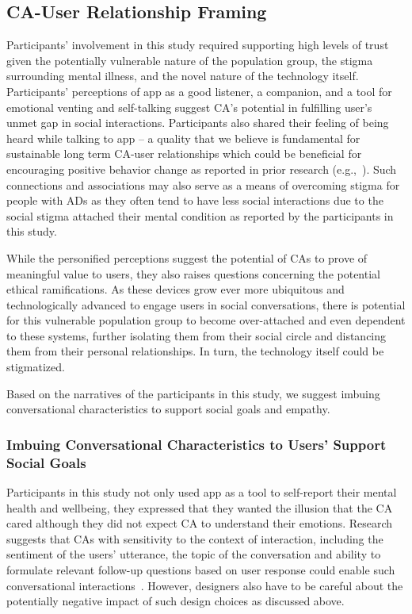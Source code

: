    
    \subsection{\ac{CA}-User Relationship Framing}
    
        Participants' involvement in this study required supporting high levels of trust given the potentially vulnerable nature of the population group, the stigma surrounding mental illness, and the novel nature of the technology itself. Participants' perceptions of \acl{app} as a good listener, a companion, and a tool for emotional venting and self-talking suggest \ac{CA}'s potential in fulfilling user's unmet gap in social interactions. Participants also shared their feeling of being heard while talking to \acl{app} -- a quality that we believe is fundamental for sustainable long term \ac{CA}-user relationships which could be beneficial for encouraging positive behavior change as reported in prior research (e.g.,~\cite{thieme2015designing, bickmore2005establishing}). Such connections and associations may also serve as a means of overcoming stigma for people with \ac{AD}s as they often tend to have less social interactions due to the social stigma attached their mental condition as reported by the participants in this study. 
        
        While the personified perceptions suggest the potential of \ac{CA}s to prove of meaningful value to users, they also raises questions concerning the potential ethical ramifications. As these devices grow ever more ubiquitous and technologically advanced to engage users in social conversations, there is potential for this vulnerable population group to become over-attached and even dependent to these systems, further isolating them from their social circle and distancing them from their personal relationships. In turn, the technology itself could be stigmatized. 
        
        Based on the narratives of the participants in this study, we suggest imbuing conversational characteristics to support social goals and empathy.

        
        \subsubsection{Imbuing Conversational Characteristics to Users' Support Social Goals}
            
            Participants in this study not only used \acl{app} as a tool to self-report their mental health and wellbeing, they expressed that they wanted the illusion that the \ac{CA} cared although they did not expect \ac{CA} to understand their emotions. Research suggests that \ac{CA}s with sensitivity to the context of interaction, including the sentiment of the users' utterance, the topic of the conversation and ability to formulate relevant follow-up questions based on user response could enable such conversational interactions~\cite{clark2019makes}. However, designers also have to be careful about the potentially negative impact of such design choices as discussed above.
            
